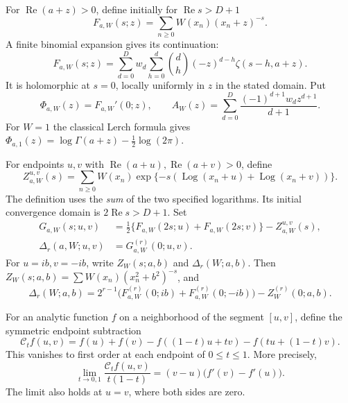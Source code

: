 \documentclass[11pt]{article}
\numberwithin{equation}{section}
\theoremstyle{definition}\newtheorem{definition}[theorem]{Definition}
\theoremstyle{remark}\newtheorem{remark}[theorem]{Remark}
\DeclareMathOperator{\Rea}{Re}
\DeclareMathOperator{\Log}{Log}
\newcommand{\CC}{\mathcal C}
\begin{document}
For $\Rea(a+z)>0$, define initially for $\Rea s>D+1$
\begin{equation}\label{hsd:eq:F}
 F_{a,W}(s;z)=\sum_{n\ge0}W(x_n)(x_n+z)^{-s}.
\end{equation}
A finite binomial expansion gives its continuation:
\begin{equation}\label{hsd:eq:Ffinite}
 F_{a,W}(s;z)=\sum_{d=0}^D w_d\sum_{h=0}^d
 \binom dh(-z)^{d-h}\zeta(s-h,a+z).
\end{equation}
It is holomorphic at $s=0$, locally uniformly in $z$ in the stated domain.
Put
\begin{equation}\label{hsd:eq:phi}
 \Phi_{a,W}(z)=F_{a,W}'(0;z),\qquad
 A_W(z)=\sum_{d=0}^D\frac{(-1)^{d+1}w_dz^{d+1}}{d+1}.
\end{equation}
For $W=1$ the classical Lerch formula gives
$\Phi_{a,1}(z)=\log\Gamma(a+z)-\tfrac12\log(2\pi)$.

For endpoints $u,v$ with $\Rea(a+u),\Rea(a+v)>0$, define
\begin{equation}\label{hsd:eq:Zuv}
 Z_{a,W}^{u,v}(s)=\sum_{n\ge0}W(x_n)
 \exp\{-s(\Log(x_n+u)+\Log(x_n+v))\}.
\end{equation}
The definition uses the \emph{sum} of the two specified logarithms.
Its initial convergence domain is $2\Rea s>D+1$.
Set
\begin{align}
 G_{a,W}(s;u,v)&=\tfrac12\{F_{a,W}(2s;u)+F_{a,W}(2s;v)\}
                    -Z_{a,W}^{u,v}(s),\label{hsd:eq:G}\\
 \Delta_r(a,W;u,v)&=G_{a,W}^{(r)}(0;u,v).\label{hsd:eq:Delta}
\end{align}
For $u=ib,v=-ib$, write $Z_W(s;a,b)$ and $\Delta_r(W;a,b)$.
Then $Z_W(s;a,b)=\sum W(x_n)(x_n^2+b^2)^{-s}$, and
\begin{equation}\label{hsd:eq:Delta-conjugate}
 \Delta_r(W;a,b)=2^{r-1}\bigl(F_{a,W}^{(r)}(0;ib)
 +F_{a,W}^{(r)}(0;-ib)\bigr)-Z_W^{(r)}(0;a,b).
\end{equation}

For an analytic function $f$ on a neighborhood of the segment $[u,v]$,
define the symmetric endpoint subtraction
\begin{equation}\label{hsd:eq:C}
 \CC_t f(u,v)=f(u)+f(v)-f((1-t)u+tv)-f(tu+(1-t)v).
\end{equation}
This vanishes to first order at each endpoint of $0\le t\le1$.
More precisely,
\begin{equation}\label{hsd:eq:C-limit}
 \lim_{t\to0,1}\frac{\CC_t f(u,v)}{t(1-t)}
 =(v-u)\bigl(f'(v)-f'(u)\bigr).
\end{equation}
The limit also holds at $u=v$, where both sides are zero.
\end{document}
